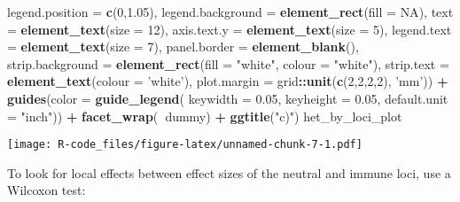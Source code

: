 \documentclass[]{article}
\newenvironment{Shaded}{\begin{snugshade}}{\end{snugshade}}
\newcommand{\KeywordTok}[1]{\textcolor[rgb]{0.13,0.29,0.53}{\textbf{#1}}}
\newcommand{\DataTypeTok}[1]{\textcolor[rgb]{0.13,0.29,0.53}{#1}}
\newcommand{\DecValTok}[1]{\textcolor[rgb]{0.00,0.00,0.81}{#1}}
\newcommand{\FloatTok}[1]{\textcolor[rgb]{0.00,0.00,0.81}{#1}}
\newcommand{\StringTok}[1]{\textcolor[rgb]{0.31,0.60,0.02}{#1}}
\newcommand{\OtherTok}[1]{\textcolor[rgb]{0.56,0.35,0.01}{#1}}
\newcommand{\OperatorTok}[1]{\textcolor[rgb]{0.81,0.36,0.00}{\textbf{#1}}}
\newcommand{\NormalTok}[1]{#1}
\begin{document}
\begin{Shaded}
\begin{Highlighting}[]
        \DataTypeTok{legend.position =} \KeywordTok{c}\NormalTok{(}\DecValTok{0}\NormalTok{,}\FloatTok{1.05}\NormalTok{),}
        \DataTypeTok{legend.background =} \KeywordTok{element_rect}\NormalTok{(}\DataTypeTok{fill =} \OtherTok{NA}\NormalTok{),}
        \DataTypeTok{text =} \KeywordTok{element_text}\NormalTok{(}\DataTypeTok{size =} \DecValTok{12}\NormalTok{),}
        \DataTypeTok{axis.text.y =} \KeywordTok{element_text}\NormalTok{(}\DataTypeTok{size =} \DecValTok{5}\NormalTok{),}
        \DataTypeTok{legend.text =} \KeywordTok{element_text}\NormalTok{(}\DataTypeTok{size =} \DecValTok{7}\NormalTok{),}
        \DataTypeTok{panel.border =} \KeywordTok{element_blank}\NormalTok{(),}
        \DataTypeTok{strip.background =} \KeywordTok{element_rect}\NormalTok{(}\DataTypeTok{fill =} \StringTok{"white"}\NormalTok{, }\DataTypeTok{colour =} \StringTok{"white"}\NormalTok{),}
        \DataTypeTok{strip.text =} \KeywordTok{element_text}\NormalTok{(}\DataTypeTok{colour =} \StringTok{'white'}\NormalTok{),}
        \DataTypeTok{plot.margin =}\NormalTok{ grid}\OperatorTok{::}\KeywordTok{unit}\NormalTok{(}\KeywordTok{c}\NormalTok{(}\DecValTok{2}\NormalTok{,}\DecValTok{2}\NormalTok{,}\DecValTok{2}\NormalTok{,}\DecValTok{2}\NormalTok{), }\StringTok{'mm'}\NormalTok{)) }\OperatorTok{+}
\StringTok{  }\KeywordTok{guides}\NormalTok{(}\DataTypeTok{color =} \KeywordTok{guide_legend}\NormalTok{(}
    \DataTypeTok{keywidth =} \FloatTok{0.05}\NormalTok{,}
    \DataTypeTok{keyheight =} \FloatTok{0.05}\NormalTok{,}
    \DataTypeTok{default.unit =} \StringTok{"inch"}\NormalTok{)) }\OperatorTok{+}
\StringTok{  }\KeywordTok{facet_wrap}\NormalTok{(}\OperatorTok{~}\NormalTok{dummy) }\OperatorTok{+}
\StringTok{  }\KeywordTok{ggtitle}\NormalTok{(}\StringTok{"c)"}\NormalTok{)}
\NormalTok{het_by_loci_plot}
\end{Highlighting}
\end{Shaded}

\texttt{[image: R-code\_files/figure-latex/unnamed-chunk-7-1.pdf]}

To look for local effects between effect sizes of the neutral and immune
loci, use a Wilcoxon test:

\begin{Shaded}
\end{Shaded}
\end{document}
